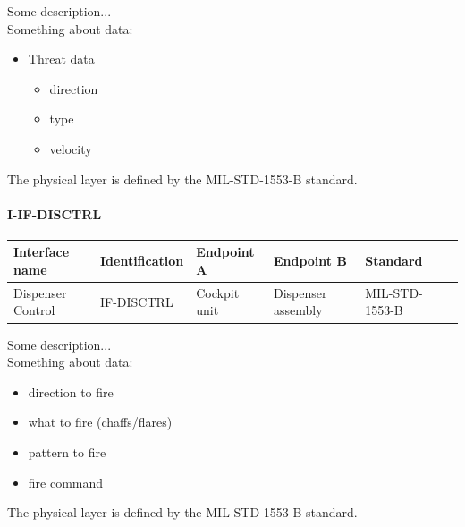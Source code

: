 Some description...
\\
Something about data:
\begin{itemize}
\item Threat data
	\begin{itemize}
	\item direction
	\item type
	\item velocity
	\end{itemize}
\end{itemize}
The physical layer is defined by the MIL-STD-1553-B standard.


\paragraph{I-IF-DISCTRL}

\begin{center}
\begin{tabular}{ | p{2cm} | l | p{1.6cm} | p{1.6cm} | l | p{1cm} |}
\hline
 \textbf{Interface name} & \textbf{Identification} & \textbf{Endpoint A} & \textbf{Endpoint B} & \textbf{Standard}\\ \hline

 Dispenser Control & IF-DISCTRL & Cockpit unit & Dispenser assembly & MIL-STD-1553-B\\ \hline
 
\end{tabular}
\end{center}

Some description...\\
Something about data:
\begin{itemize}
\item direction to fire
\item what to fire (chaffs/flares)
\item pattern to fire
\item fire command
\end{itemize}

The physical layer is defined by the MIL-STD-1553-B standard.